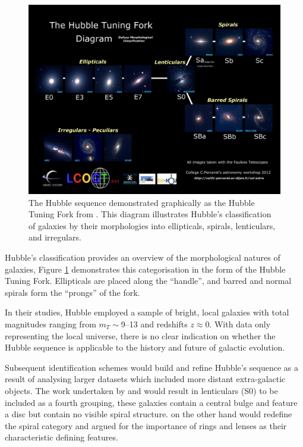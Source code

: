 \documentclass[12pt, twocolumn]{revtex4-1}    %
\begin{document}
\begin{figure}
\includegraphics[width=\textwidth]{introduction/hubble-tuning-fork-diagram}
\caption{The Hubble sequence demonstrated graphically as the Hubble Tuning Fork from \cite{hubble_tuning_fork} . This diagram illustrates Hubble's classification of galaxies by their morphologies into ellipticals, spirals, lenticulars, and irregulars.}
\label{fig:hubble_tuning_fork}
\end{figure}

Hubble's classification provides an overview of the morphological natures of galaxies, Figure \ref{fig:hubble_tuning_fork} demonstrates this categorisation in the form of the Hubble Tuning Fork. Ellipticals are placed along the ``handle'', and barred and normal spirals form the ``prongs'' of the fork. 

In their studies, Hubble employed a sample of bright, local galaxies with total magnitudes ranging from $m_T\sim$9--13 and redshifts $z\approx0$. With data only representing the local universe, there is no clear indication on whether the Hubble sequence is applicable to the history and future of galactic evolution. 

Subsequent identification schemes would build and refine Hubble's sequence as a result of analysing larger datasets which included more distant extra-galactic objects. The work undertaken by \cite{1961hag..book.....S, 1975gaun.book....1S} and \cite{1994cag..book.....S} would result in lenticulars (S0) to be included as a fourth grouping, these galaxies contain a central bulge and feature a disc but contain no visible spiral structure. \cite{1959HDP....53..275D} on the other hand would redefine the spiral category and argued for the importance of rings and lenses as their characteristic defining features. 
\end{document}

